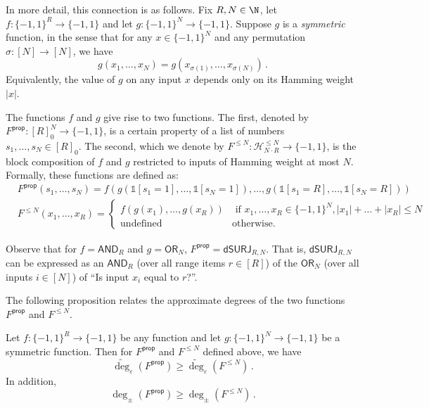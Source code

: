 \documentclass{toc}
\newcommand{\dumSURJ}{\mathsf{dSURJ}}
\newcommand{\OR}{\mathsf{ OR}}
\newcommand{\bits}{\{-1,1\}}
\newcommand{\eps}{\varepsilon}
\newcommand{\adeg}{\widetilde{\operatorname{deg}}}
\newcommand{\AND}{\mathsf{AND}}
\begin{document}
In more detail, this connection is as follows. 
Fix $R, N \in \N$, let $f : \bits^R \to \bits$ and let $g : \bits^N \to \bits$. Suppose $g$ is a \emph{symmetric} function, in the sense that for any $x \in \bits^N$ and any permutation $\sigma : [N] \to [N]$, we have
\[g(x_1, \dots, x_N) = g(x_{\sigma(1)}, \dots, x_{\sigma(N)})\,.\]
Equivalently, the value of $g$ on any input $x$ depends only on its Hamming weight $|x|$.

The functions $f$ and $g$ give rise to two functions. The first, denoted by $F^{\mathsf{prop}} : [R]^N_0 \to \bits$, is a certain property of a list of numbers $s_1, \dots, s_N \in [R]_0$. The second, which we denote by $F^{\le N} : \mathcal{H}_{N \cdot R}^{\le N} \to \bits$, is the block composition of $f$ and $g$ restricted to inputs of Hamming weight at most $N$. Formally, these functions are defined as:
\begin{align*}
&F^{\mathsf{prop}}(s_1, \dots, s_N) = f(g(\mathds{1}[s_1 = 1], \dots, \mathds{1}[s_N = 1]), \dots, g(\mathds{1}[s_1=R], \dots,\mathds{1}[s_N=R])) \\
&F^{\le N}(x_1, \dots, x_R) = \begin{cases} f(g(x_1), \dots, g(x_R)) & \text{ if } x_1, \dots, x_R \in \bits^N,  |x_1| + \dots + |x_R| \le N\\
\text{undefined} & \text{otherwise}.
\end{cases}
\end{align*}

Observe that for $f=\AND_R$ and $g = \OR_N$, $F^{\mathsf{prop}}=\dumSURJ_{R, N}$. 
That is, $\dumSURJ_{R, N}$ can be expressed as an $\AND_R$ (over all range items $r \in [R]$) of the $\OR_N$ (over all inputs $i \in [N]$) of ``Is input $x_i$ equal to $r$?''.

The following proposition relates the approximate degrees of the two functions $F^{\mathsf{prop}}$ and $F^{\le N}$.

\begin{theorem} \label{thm:main-reduction}
	Let $f : \bits^R \to \bits$ be any function and let $g : \bits^N \to \bits$ be a symmetric function. Then for $F^{\mathsf{prop}}$ and $F^{\le N}$ defined above, we have
	\[\adeg_{\eps}(F^{\mathsf{prop}}) \ge \adeg_{\eps}(F^{\le N})\,.\]
	In addition, \[\deg_{\pm}(F^{\mathsf{prop}}) \ge \deg_{\pm}(F^{\le N})\,.\]
\end{theorem}
\end{document}
